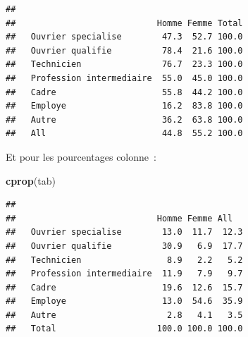 \documentclass[12pt,]{book}
\newenvironment{Shaded}{\begin{snugshade}}{\end{snugshade}}
\newcommand{\KeywordTok}[1]{\textcolor[rgb]{0.13,0.29,0.53}{\textbf{#1}}}
\newcommand{\NormalTok}[1]{#1}
\newcommand{\OperatorTok}[1]{\textcolor[rgb]{0.81,0.36,0.00}{\textbf{#1}}}
\newcommand{\StringTok}[1]{\textcolor[rgb]{0.31,0.60,0.02}{#1}}
\begin{document}
\begin{Shaded}
\end{Shaded}

\begin{verbatim}
##                           
##                            Homme Femme Total
##   Ouvrier specialise        47.3  52.7 100.0
##   Ouvrier qualifie          78.4  21.6 100.0
##   Technicien                76.7  23.3 100.0
##   Profession intermediaire  55.0  45.0 100.0
##   Cadre                     55.8  44.2 100.0
##   Employe                   16.2  83.8 100.0
##   Autre                     36.2  63.8 100.0
##   All                       44.8  55.2 100.0
\end{verbatim}

Et pour les pourcentages colonne~:

\begin{Shaded}
\begin{Highlighting}[]
\KeywordTok{cprop}\NormalTok{(tab)}
\end{Highlighting}
\end{Shaded}

\begin{verbatim}
##                           
##                            Homme Femme All  
##   Ouvrier specialise        13.0  11.7  12.3
##   Ouvrier qualifie          30.9   6.9  17.7
##   Technicien                 8.9   2.2   5.2
##   Profession intermediaire  11.9   7.9   9.7
##   Cadre                     19.6  12.6  15.7
##   Employe                   13.0  54.6  35.9
##   Autre                      2.8   4.1   3.5
##   Total                    100.0 100.0 100.0
\end{verbatim}
\end{document}
